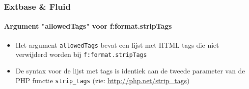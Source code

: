 
\begin{frame}[fragile]
	\frametitle{Extbase \& Fluid}
	\framesubtitle{Argument "allowedTags" voor f:format.stripTags}

	\begin{itemize}

		\item Het argument \texttt{allowedTags} bevat een lijst met HTML tags
		 	die niet verwijderd worden bij \texttt{f:format.stripTags}

		\item De syntax voor de lijst met tags is identiek aan de tweede parameter
		 	van de PHP functie \texttt{strip\_tags} (zie: \url{http://php.net/strip_tags})

	\end{itemize}

\end{frame}


